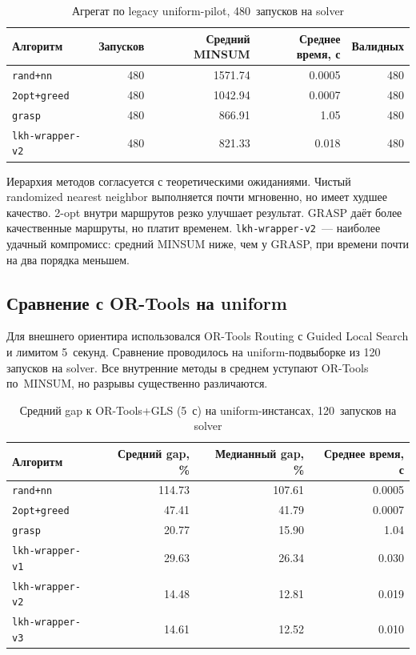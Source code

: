 \documentclass[14pt,a4paper]{extarticle}
\begin{document}
\begin{table}[H]
\centering
\caption{Агрегат по legacy uniform-pilot, 480~запусков на solver}
\small
\begin{tabular}{lrrrr}
\toprule
Алгоритм & Запусков & Средний MINSUM & Среднее время, с & Валидных\\
\midrule
\texttt{rand+nn}        & 480 & 1571.74 & 0.0005 & 480\\
\texttt{2opt+greed}     & 480 & 1042.94 & 0.0007 & 480\\
\texttt{grasp}          & 480 &  866.91 & 1.05   & 480\\
\texttt{lkh-wrapper-v2} & 480 &  821.33 & 0.018  & 480\\
\bottomrule
\end{tabular}
\normalsize
\end{table}

Иерархия методов согласуется с теоретическими ожиданиями. Чистый randomized nearest neighbor выполняется почти мгновенно, но имеет худшее качество. 2-opt внутри маршрутов резко улучшает результат. GRASP даёт более качественные маршруты, но платит временем. \texttt{lkh-wrapper-v2}~--- наиболее удачный компромисс: средний MINSUM ниже, чем у GRASP, при времени почти на два порядка меньшем.

\subsection{Сравнение с OR-Tools на uniform}

Для внешнего ориентира использовался OR-Tools Routing с Guided Local Search и лимитом 5~секунд. Сравнение проводилось на uniform-подвыборке из 120 запусков на solver. Все внутренние методы в среднем уступают OR-Tools по~MINSUM, но разрывы существенно различаются.

\begin{table}[H]
\centering
\caption{Средний gap к OR-Tools+GLS (5~с) на uniform-инстансах, 120~запусков на solver}
\small
\begin{tabular}{lrrr}
\toprule
Алгоритм & Средний gap, \% & Медианный gap, \% & Среднее время, с\\
\midrule
\texttt{rand+nn}        & 114.73 & 107.61 & 0.0005\\
\texttt{2opt+greed}     &  47.41 &  41.79 & 0.0007\\
\texttt{grasp}          &  20.77 &  15.90 & 1.04\\
\texttt{lkh-wrapper-v1} &  29.63 &  26.34 & 0.030\\
\texttt{lkh-wrapper-v2} &  14.48 &  12.81 & 0.019\\
\texttt{lkh-wrapper-v3} &  14.61 &  12.52 & 0.010\\
\bottomrule
\end{tabular}
\normalsize
\end{table}
\end{document}

